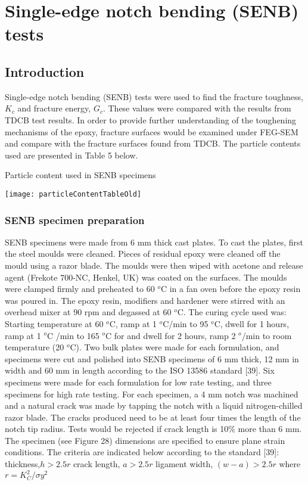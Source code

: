 \documentclass[numbers=noendperiod,chapterprefix=on]{icldt} %
\begin{document}
\section{Single-edge notch bending (SENB) tests}
\subsection{Introduction}
Single-edge notch bending (SENB) tests were used to find the fracture toughness, $K_c$ and fracture energy, $G_c$. These values were compared with the results from TDCB test results. In order to provide further understanding of the toughening mechanisms of the epoxy, fracture surfaces would be examined under FEG-SEM and compare with the fracture surfaces found from TDCB. The particle contents used are presented in Table 5 below.

\begin{table}[!htpb]
\centering
\caption{Particle content used in SENB specimens} %
\texttt{[image: particleContentTableOld]}
\end{table}

\subsubsection{SENB specimen preparation}
SENB specimens were made from 6 mm thick cast plates. To cast the plates, first the steel moulds were cleaned. Pieces of residual epoxy were cleaned off the mould using a razor blade. The moulds were then wiped with acetone and release agent (Frekote 700-NC, Henkel, UK) was coated on the surfaces. The moulds were clamped firmly and preheated to 60 $^o$C in a fan oven before the epoxy resin was poured in. 
The epoxy resin, modifiers and hardener were stirred with an overhead mixer at 90 rpm and degassed at 60 $^o$C. The curing cycle used was: Starting temperature at 60 $^o$C, ramp at 1 $^o$C/min to 95 $^o$C, dwell for 1 hours, ramp at 1 $^o$C /min to 165 $^o$C for and dwell for 2 hours, ramp 2 $^o$/min to room temperature (20 $^o$C).
Two bulk plates were made for each formulation, and specimens were cut and polished into SENB specimens of 6 mm thick, 12 mm in width and 60 mm in length according to the ISO 13586 standard [39]. Six specimens were made for each formulation for low rate testing, and three specimens for high rate testing. 
For each specimen, a 4 mm notch was machined and a natural crack was made by tapping the notch with a liquid nitrogen-chilled razor blade. The cracks produced need to be at least four times the length of the notch tip radius. Tests would be rejected if crack length is 10\% more than 6 mm.
The specimen (see Figure 28) dimensions are specified to ensure plane strain conditions. The criteria are indicated below according to the standard [39]:
\newline
thickness,$ h > 2.5 r$
\newline
crack length, $a > 2.5 r$
\newline
ligament width, $(w - a) > 2.5 r$
\newline
where $r = K_C^2/\sigma y^2 $
\end{document}

